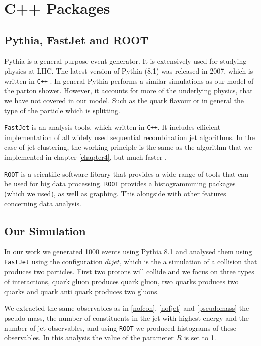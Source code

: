 \chapter{C++ Packages}\label{chap6}
\section{Pythia, FastJet and ROOT}
Pythia is a general-purpose event generator. It is extensively used for studying physics at LHC.
The latest version of Pythia (8.1) was released in 2007, which is written in \verb!C++!  \citep{Buckley:2011ms}.
In general Pythia performs a similar simulations as our model of the parton shower.
However, it accounts for more of the underlying physics, that we have not covered in our model. Such  as the quark flavour or in general the type of the particle which is splitting.  


\verb+FastJet+ is an analysis tools, which written in \verb!C++!. It includes efficient implementation of all widely used sequential recombination jet algorithms. In the case of jet clustering, the working principle is the same as the algorithm that we implemented in chapter \ref{chapter4}, 
but much faster \citep{Buckley:2011ms}. 

\verb+ROOT+ is a scientific software library that provides a wide range of tools that can be used for big data processing. \verb+ROOT+ provides a histogrammming packages (which we used), as well as graphing. This alongside with other features concerning data analysis.  
\section{Our Simulation}
In our work we generated 1000 events using Pythia 8.1 and analysed them using \verb+FastJet+ using the configuration $dijet$, which is the a simulation of a collision that produces two particles. First two protons will collide and we focus on three types of  interactions, quark gluon produces quark gluon, two quarks produces two quarks and quark anti quark produces two gluons.    

We extracted the same  observables as in \ref{nofcon}, \ref{nofjet} and \ref{pseudomass}  the pseudo-mass, the number of constituents in the jet with highest energy and the number of jet observables, and using \verb+ROOT+ we produced histograms of these observables. In this analysis the value of the parameter $R$ is set to 1.

